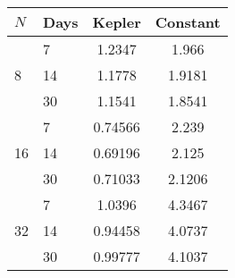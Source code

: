 \begin{tabular}{l|lcc}
\hline
$N$ & Days & Kepler & Constant \\
\hline
\multirow{3}{*}{8} & 7 & 1.2347 & 1.966 \\ 
&14 & 1.1778 & 1.9181 \\ 
&30 & 1.1541 & 1.8541 \\ \hline
\multirow{3}{*}{16} & 7 & 0.74566 & 2.239 \\ 
&14 & 0.69196 & 2.125 \\ 
&30 & 0.71033 & 2.1206 \\ \hline
\multirow{3}{*}{32} & 7 & 1.0396 & 4.3467 \\ 
&14 & 0.94458 & 4.0737 \\ 
&30 & 0.99777 & 4.1037 \\\hline
\end{tabular}


